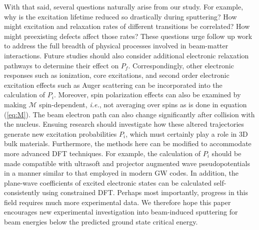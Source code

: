 \documentclass{article}
\begin{document}
With that said, %
several questions naturally arise from our study.
For example, why is the excitation lifetime reduced so drastically during
sputtering?
How might excitation and relaxation rates of different transitions be
correlated?
How might preexisting defects affect those rates?
These questions urge follow up work to address the full breadth of physical
processes involved in beam-matter interactions.
Future studies should also consider additional electronic relaxation pathways
to determine their effect on $P_f$.
Correspondingly, other electronic responses such as ionization, core
excitations, and second order electronic excitation effects such as Auger
scattering can be incorporated into the calculation of $P_i$.
\cite{Lagarde2014,Kozawa2014,Nie2015,Shi2013b}
Moreover, spin polarization effects can also be examined by making $\mathcal{M}$
spin-dependent, \textit{i.e.}, not averaging over spins as is done in equation
(\ref{eq:M}).
The beam electron path can also change significantly after collision with
the nucleus.
Ensuing research should investigate how these altered trajectories generate new
excitation probabilities $P_i$, which must certainly play a role in 3D bulk
materials.
Furthermore, the methods here can be modified to accommodate more advanced DFT
techniques.
For example, the calculation of $P_i$ should be made compatible with ultrasoft
and projector augmented wave pseudopotentials \cite{Blochl1994} in a manner
similar to that employed in modern GW codes.\cite{Shishkin2006a, Gajdos2006,
Paier2005}
In addition, the plane-wave coefficients of excited electronic states can be
calculated self-consistently using constrained DFT.\cite{Kaduk2012}
Perhaps most importantly, progress in this field requires much more experimental
data.
We therefore hope this paper encourages new experimental investigation into
beam-induced sputtering for beam energies below the predicted ground state
critical energy.
\end{document}
